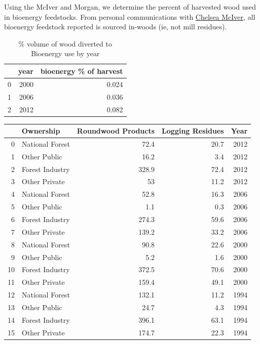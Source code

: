 \documentclass[a4paper]{article}
\begin{document}
Using the McIver and Morgan, we determine the percent of harvested wood used in bioenergy
feedstocks. From personal communications with
\href{http://www.bber.umt.edu/staff/mciver.asp}{Chelsea McIver}, all bioenergy feedstock reported is sourced in-woods (ie, not mill
residues).

\begin{table}[htb]
\caption{\% volume of wood diverted to Bioenergy use by year \label{tab:bio_vol}}
\centering
\begin{tabular}{rrr}
 & year & bioenergy \% of harvest\\
\hline
0 & 2000 & 0.024\\
1 & 2006 & 0.036\\
2 & 2012 & 0.082\\
\end{tabular}
\end{table}



\begin{center}
\begin{tabular}{rlrrr}
 & Ownership & Roundwood Products & Logging Residues & Year\\
\hline
0 & National Forest & 72.4 & 20.7 & 2012\\
1 & Other Public & 16.2 & 3.4 & 2012\\
2 & Forest Industry & 328.9 & 72.4 & 2012\\
3 & Other Private & 53 & 11.2 & 2012\\
4 & National Forest & 52.8 & 16.3 & 2006\\
5 & Other Public & 1.1 & 0.3 & 2006\\
6 & Forest Industry & 274.3 & 59.6 & 2006\\
7 & Other Private & 139.2 & 33.2 & 2006\\
8 & National Forest & 90.8 & 22.6 & 2000\\
9 & Other Public & 5.2 & 1.6 & 2000\\
10 & Forest Industry & 372.5 & 70.6 & 2000\\
11 & Other Private & 159.4 & 49.1 & 2000\\
12 & National Forest & 132.1 & 11.2 & 1994\\
13 & Other Public & 24.7 & 4.3 & 1994\\
14 & Forest Industry & 396.1 & 63.1 & 1994\\
15 & Other Private & 174.7 & 22.3 & 1994\\
\end{tabular}
\end{center}
\end{document}
